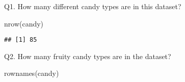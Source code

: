 \documentclass[
]{article}
\newenvironment{Shaded}{\begin{snugshade}}{\end{snugshade}}
\newcommand{\FunctionTok}[1]{\textcolor[rgb]{0.00,0.00,0.00}{#1}}
\newcommand{\NormalTok}[1]{#1}
\begin{document}
Q1. How many different candy types are in this dataset?

\begin{Shaded}
\begin{Highlighting}[]
\FunctionTok{nrow}\NormalTok{(candy)}
\end{Highlighting}
\end{Shaded}

\begin{verbatim}
## [1] 85
\end{verbatim}

Q2. How many fruity candy types are in the dataset?

\begin{Shaded}
\begin{Highlighting}[]
\FunctionTok{rownames}\NormalTok{(candy)}
\end{Highlighting}
\end{Shaded}
\end{document}
